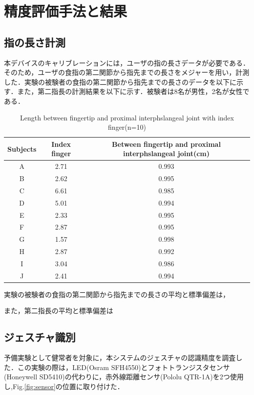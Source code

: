 \chapter{精度評価手法と結果}

\section{指の長さ計測}
本デバイスのキャリブレーションには，ユーザの指の長さデータが必要である．そのため，ユーザの食指の第二関節から指先までの長さをメジャーを用い，計測した．実験の被験者の食指の第二関節から指先までの長さのデータを以下に示す．また，第二指長の計測結果を以下に示す．被験者は8名が男性，2名が女性である．

\begin{table}[H]
  \caption{Length between fingertip and proximal interphslangeal joint with index finger(n=10)}
  \label{table:finger_distance}
  \centering
  \begin{tabular}{ccc}
    \hline
    Subjects & Index finger& Between fingertip and proximal interphslangeal joint(cm)  \\
    \hline \hline
    A  & 2.71 & 0.993\\
    B  & 2.62 & 0.995\\
    C  & 6.61 & 0.985\\
    D  & 5.01 & 0.994\\
    E  & 2.33 & 0.995\\ 
    F  & 2.87 & 0.995\\
    G  & 1.57 & 0.998\\
    H  & 2.87 & 0.992\\
    I  & 3.04 & 0.986\\
    J  & 2.41 & 0.994\\
    \hline
  \end{tabular}
\end{table}

実験の被験者の食指の第二関節から指先までの長さの平均と標準偏差は，

また，第二指長の平均と標準偏差は




\section{ジェスチャ識別}
予備実験として健常者を対象に，本システムのジェスチャの認識精度を調査した．この実験の際は，LED(Osram SFH4550)とフォトトランジスタセンサ(Honeywell SD5410)の代わりに，赤外線距離センサ(Pololu QTR-1A)を2つ使用し,Fig.\ref{fig:sensor}の位置に取り付けた．

